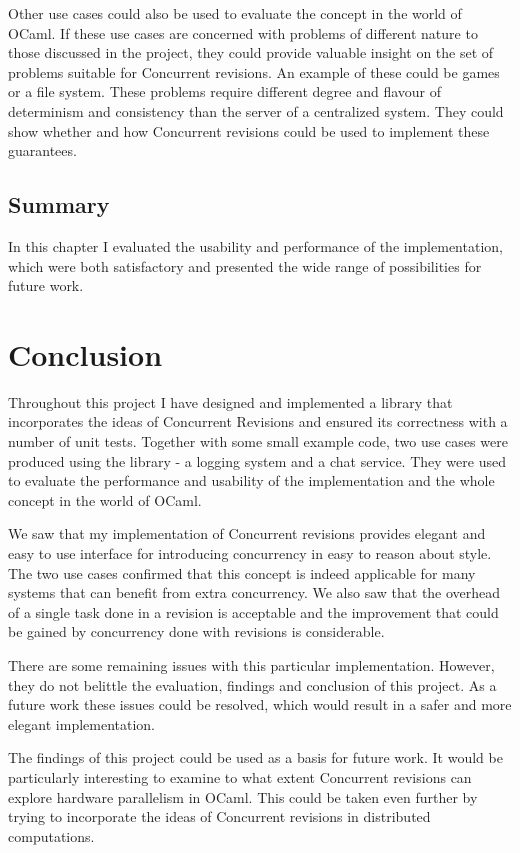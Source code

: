 \documentclass[12pt,twoside,notitlepage]{report}
\begin{document}
Other use cases could also be used to evaluate the concept in the world of OCaml. If these use cases are concerned with problems of different nature to those discussed in the project, they could provide valuable insight on the set of problems suitable for Concurrent revisions. An example of these could be games or a file system. These problems require different degree and flavour of determinism and consistency than the server of a centralized system. They could show whether and how Concurrent revisions could be used to implement these guarantees. 


\section{Summary}
In this chapter I evaluated the usability and performance of the implementation, which were both satisfactory and presented the wide range of possibilities for future work. 

\cleardoublepage
\chapter{Conclusion}

Throughout this project I have designed and implemented a library that incorporates the ideas of Concurrent Revisions and ensured its correctness with a number of unit tests. Together with some small example code, two use cases were produced using the library - a logging system and a chat service. They were used to evaluate the performance and usability of the implementation and the whole concept in the world of OCaml.

We saw that my implementation of Concurrent revisions provides elegant and easy to use interface for introducing concurrency in easy to reason about style. The two use cases confirmed that this concept is indeed applicable for many systems that can benefit from extra concurrency. We also saw that the overhead of a single task done in a revision is acceptable and the improvement that could be gained by concurrency done with revisions is considerable.

There are some remaining issues with this particular implementation. However, they do not belittle the evaluation, findings and conclusion of this project. As a future work these issues could be resolved, which would result in a safer and more elegant implementation.

The findings of this project could be used as a basis for future work. It would be particularly interesting to examine to what extent Concurrent revisions can explore hardware parallelism in OCaml. This could be taken even further by trying to incorporate the ideas of Concurrent revisions in distributed computations.       
\end{document}
